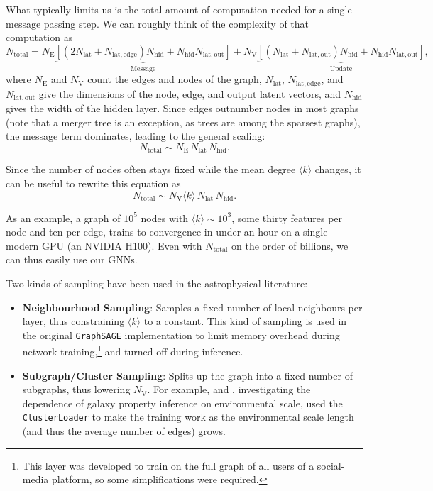 \documentclass[graybox, envcountchap]{Template/svmult}
\begin{document}
What typically limits us is the total amount of computation needed for a single message passing step. We can roughly think of the complexity of that computation as
\begin{equation}
    N_\mathrm{total} = N_\mathrm{E} \underbrace{\left[ \left( 2N_\mathrm{lat} + N_\mathrm{lat,edge} \right) N_\mathrm{hid} + N_\mathrm{hid} N_\mathrm{lat,out} \right]}_{\mathrm{Message}} + N_\mathrm{V} \underbrace{\left[ \left( N_\mathrm{lat} + N_\mathrm{lat,out} \right) N_\mathrm{hid} + N_\mathrm{hid} N_\mathrm{lat,out} \right]}_{\mathrm{Update}},
\end{equation}
where $N_\mathrm{E}$ and $N_\mathrm{V}$ count the edges and nodes of the graph, $N_\mathrm{lat}$, $N_\mathrm{lat,edge}$, and $N_\mathrm{lat,out}$ give the dimensions of the node, edge, and output latent vectors, and $N_\mathrm{hid}$ gives the width of the hidden layer. Since edges outnumber nodes in most graphs (note that a merger tree is an exception, as trees are among the sparsest graphs), the message term dominates, leading to the general scaling:
\begin{equation}
    N_\mathrm{total} \sim N_\mathrm{E} \, N_\mathrm{lat} \, N_\mathrm{hid}.
\end{equation}

Since the number of nodes often stays fixed while the mean degree $\langle k\rangle$ changes, it can be useful to rewrite this equation as
\begin{equation}
    N_\mathrm{total} \sim N_\mathrm{V} \langle k \rangle \, N_\mathrm{lat} \, N_\mathrm{hid}.
\end{equation}

As an example, a graph of $10^{5}$ nodes with $\langle k\rangle \sim 10^3$, some thirty features per node and ten per edge, trains to convergence in under an hour on a single modern GPU (an NVIDIA H100). Even with $N_\mathrm{total}$ on the order of billions, we can thus easily use our GNNs.

Two kinds of sampling have been used in the astrophysical literature:

\begin{itemize}
    \item \textbf{Neighbourhood Sampling}: Samples a fixed number of local neighbours per layer, thus constraining $\langle k\rangle$ to a constant. This kind of sampling is used in the original \texttt{GraphSAGE} implementation to limit memory overhead during network training,\footnote{This layer was developed to train on the full graph of all users of a social-media platform, so some simplifications were required.} and turned off during inference.
    \item \textbf{Subgraph/Cluster Sampling}: Splits up the graph into a fixed number of subgraphs, thus lowering $N_\mathrm{V}$. For example, \citet{Wu2023_galaxyenvironment_GNN} and \citet{Wu2024_galaxyhalo_environment}, investigating the dependence of galaxy property inference on environmental scale, used the \texttt{ClusterLoader} to make the training work as the environmental scale length (and thus the average number of edges) grows.
\end{itemize}
\end{document}
